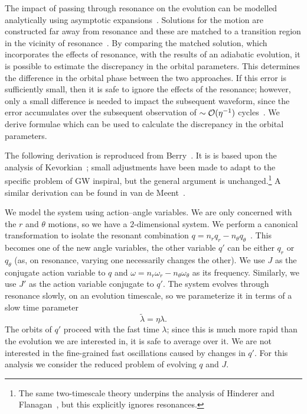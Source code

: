 
The impact of passing through resonance on the evolution can be modelled analytically using asymptotic expansions~\cite{Gair2012}. Solutions for the motion are constructed far away from resonance and these are matched to a transition region in the vicinity of resonance~\cite{Kevorkian1971,Bosley1992}. By comparing the matched solution, which incorporates the effects of resonance, with the results of an adiabatic evolution, it is possible to estimate the discrepancy in the orbital parameters. This determines the difference in the orbital phase between the two approaches. If this error is sufficiently small, then it is safe to ignore the effects of the resonance; however, only a small difference is needed to impact the subsequent waveform, since the error accumulates over the subsequent observation of $\sim \mathcal{O}({\eta^{-1}})$ cycles~\cite{Flanagan2012}. We derive formulae which can be used to calculate the discrepancy in the orbital parameters.

The following derivation is reproduced from Berry~\cite{BerryThesis2013}. It is is based upon the analysis of Kevorkian~\cite{Kevorkian1987}; small adjustments have been made to adapt to the specific problem of GW inspiral, but the general argument is unchanged.\footnote{The same two-timescale theory underpins the analysis of Hinderer and Flanagan~\cite{Hinderer2008}, but this explicitly ignores resonances.} A similar derivation can be found in van de Meent~\cite{VanDeMeent2013}.

We model the system using action--angle variables. We are only concerned with the $r$ and $\theta$ motions, so we have a $2$-dimensional system. We perform a canonical transformation  to isolate the resonant combination $q = n_r q_r - n_\theta q_\theta$~\cite{Bosley1992,VanDeMeent2013}. This becomes one of the new angle variables, the other variable $q'$ can be either $q_r$ or $q_\theta$ (as, on resonance, varying one necessarily changes the other). We use $J$ as the conjugate action variable to $q$ and $\omega = n_r \omega_r - n_\theta \omega_\theta$ as its frequency. Similarly, we use $J'$ as the action variable conjugate to $q'$. The system evolves through resonance slowly, on an evolution timescale, so we parameterize it in terms of a slow time parameter
\begin{equation}
\widetilde{\lambda} = \eta\lambda.
\end{equation}
The orbits of $q'$ proceed with the fast time $\lambda$; since this is much more rapid than the evolution we are interested in, it is safe to average over it. We are not interested in the fine-grained fast oscillations caused by changes in $q'$. For this analysis we consider the reduced problem of evolving $q$ and $J$.

